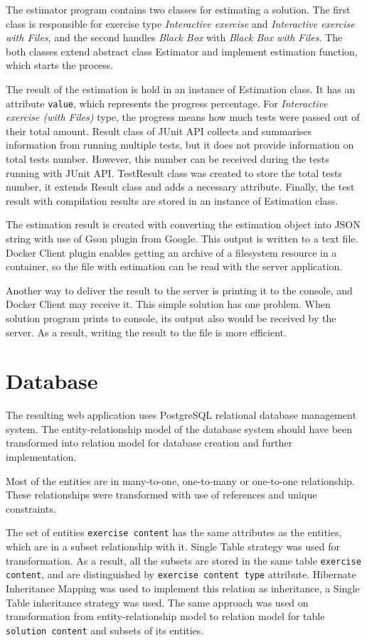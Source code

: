         The estimator program contains two classes for estimating a solution. The first class is responsible for exercise type \textit{Interactive exercise} and \textit{Interactive exercise with Files}, and the second handles \textit{Black Box} with \textit{Black Box with Files}. The both classes extend abstract class Estimator and implement estimation function, which starts the process.
        
        The result of the estimation is hold in an instance of Estimation class. It has an attribute \texttt{value}, which represents the progress percentage. For \textit{Interactive exercise (with Files)} type, the progress means how much tests were passed out of their total amount. Result class of JUnit API collects and summarises information from running multiple tests, but it does not provide information on total tests number. However, this number can be received during the tests running with JUnit API. TestResult class was created to store the total tests number, it extends Result class and adds a necessary attribute. Finally, the test result with compilation results are stored in an instance of Estimation class.
        
        The estimation result is created with converting the estimation object into JSON string with use of Gson plugin from Google. This output is written to a text file. Docker Client plugin enables getting an archive of a filesystem resource in a container, so the file with estimation can be read with the server application.
        
        Another way to deliver the result to the server is printing it to the console, and Docker Client may receive it. This simple solution has one problem. When solution program prints to console, its output also would be received by the server. As a result, writing the result to the file is more efficient.
    
    
    \section{Database}
    The resulting web application uses PostgreSQL relational database management system. The entity-relationship model of the database system should have been transformed into relation model for database creation and further implementation.
    
    Most of the entities are in many-to-one, one-to-many or one-to-one relationship. These relationships were transformed with use of references and unique constraints.
    
    The set of entities \texttt{exercise content} has the same attributes as the entities, which are in a subset relationship with it. Single Table strategy was used for transformation. As a result, all the subsets are stored in the same table \texttt{exercise content}, and are distinguished by \texttt{exercise content type} attribute. Hibernate Inheritance Mapping was used to implement this relation as inheritance, a Single Table inheritance strategy was used. The same approach was used on transformation from entity-relationship model to relation model for table \texttt{solution content} and subsets of its entities.
    
    

